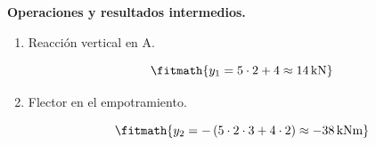 \noindent\textbf{Operaciones y resultados intermedios.}

\begin{enumerate}

\item Reacción vertical en A.

\[\fitmath{y_{1}=5\cdot 2+4\approx 14\,\mathrm{kN}}\]

\item Flector en el empotramiento.

\[\fitmath{y_{2}=-\left(5\cdot 2\cdot 3+4\cdot 2\right)\approx -38\,\mathrm{kN m}}\]

\end{enumerate}
